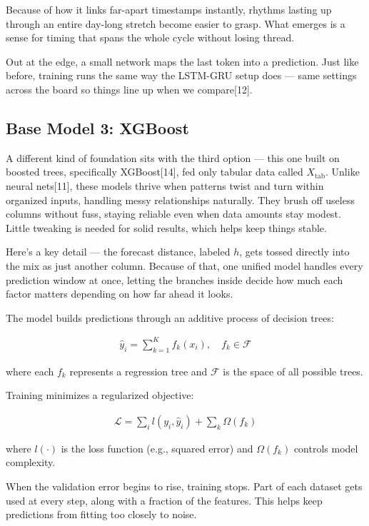 \documentclass[conference]{IEEEtran}
\begin{document}
Because of how it links far-apart timestamps instantly, rhythms lasting up through an entire day-long stretch become easier to grasp. What emerges is a sense for timing that spans the whole cycle without losing thread.

Out at the edge, a small network maps the last token into a prediction. Just like before, training runs the same way the LSTM-GRU setup does — same settings across the board so things line up when we compare[12].

\subsection{Base Model 3: XGBoost}

A different kind of foundation sits with the third option — this one built on boosted trees, specifically XGBoost[14], fed only tabular data called $X_{\text{tab}}$. Unlike neural nets[11], these models thrive when patterns twist and turn within organized inputs, handling messy relationships naturally. They brush off useless columns without fuss, staying reliable even when data amounts stay modest. Little tweaking is needed for solid results, which helps keep things stable.

Here’s a key detail — the forecast distance, labeled $h$, gets tossed directly into the mix as just another column. Because of that, one unified model handles every prediction window at once, letting the branches inside decide how much each factor matters depending on how far ahead it looks.

The model builds predictions through an additive process of decision trees:

\begin{align}
\hat{y}_i = \sum_{k=1}^{K} f_k(x_i), \quad f_k \in \mathcal{F}
\end{align}

where each $f_k$ represents a regression tree and $\mathcal{F}$ is the space of all possible trees.

Training minimizes a regularized objective:

\begin{align}
\mathcal{L} = \sum_{i} l(y_i, \hat{y}_i) + \sum_{k} \Omega(f_k)
\end{align}

where $l(\cdot)$ is the loss function (e.g., squared error) and $\Omega(f_k)$ controls model complexity.

When the validation error begins to rise, training stops. Part of each dataset gets used at every step, along with a fraction of the features. This helps keep predictions from fitting too closely to noise.
\end{document}
